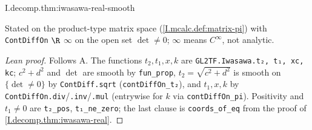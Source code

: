 \begin{theorem}
\end{theorem}
\begin{tfformal}{I.decomp.thm:iwasawa-real-smooth}
\begin{tffidelity}
Stated on the product-type matrix space (\cref{I.mcalc.def:matrix-pi}) with \texttt{ContDiffOn} $\R$ $\infty$ on the open set $\det\neq0$; $\infty$ means $C^\infty$, not analytic.
\end{tffidelity}
\end{tfformal}
\begin{proof}[Lean proof]
Follows A. The functions $t_2,t_1,x,k$ are \texttt{GL2TF.Iwasawa.t₂, t₁, xc, kc}; $c^2+d^2$ and $\det$ are smooth by \texttt{fun\_prop}, $t_2=\sqrt{c^2+d^2}$ is smooth on $\{\det\neq0\}$ by \texttt{ContDiff.sqrt} (\texttt{contDiffOn\_t₂}), and $t_1,x,k$ by \texttt{ContDiffOn.div}/\texttt{.inv}/\texttt{.mul} (entrywise for $k$ via \texttt{contDiffOn\_pi}). Positivity and $t_1\neq0$ are \texttt{t₂\_pos}, \texttt{t₁\_ne\_zero}; the last clause is \texttt{coords\_of\_eq} from the proof of \cref{I.decomp.thm:iwasawa-real}.
\end{proof}

